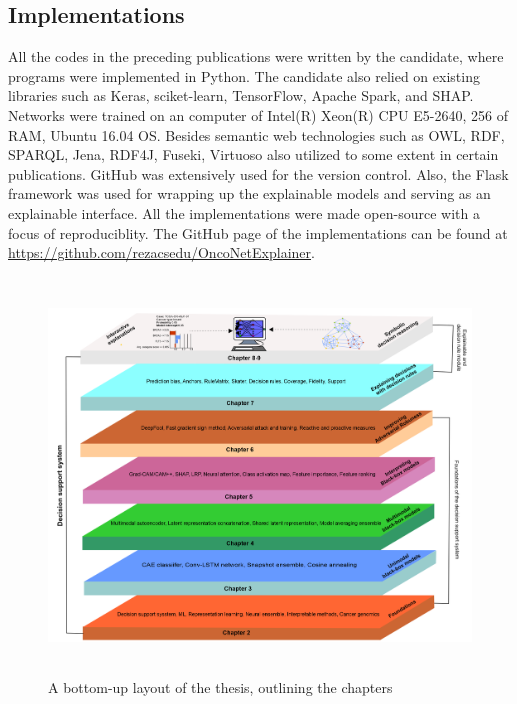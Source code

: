 \subsection{Implementations}
All the codes in the preceding publications were written by the candidate, where programs were implemented in Python. The candidate also relied on existing libraries such as Keras, sciket-learn, TensorFlow, Apache Spark, and SHAP. %
Networks were trained on an computer of Intel(R) Xeon(R) CPU E5-2640, 256 of RAM, Ubuntu 16.04 OS. 
Besides semantic web technologies such as OWL, RDF, SPARQL, Jena, RDF4J, Fuseki, Virtuoso also utilized to some extent in certain publications. GitHub was extensively used for the  version control. 
Also, the Flask framework was used for wrapping up the explainable models and serving as an explainable interface. All the implementations were made open-source with a focus of reproduciblity. The GitHub page of the implementations can be found at \url{https://github.com/rezacsedu/OncoNetExplainer}.

\begin{figure}[h]
	\centering
		\includegraphics[width=0.8\linewidth,height=105mm]{images/chapter_outline.png}
		\caption{A bottom-up layout of the thesis, outlining the chapters}
        \label{fig:chapter_organization}
\end{figure}

